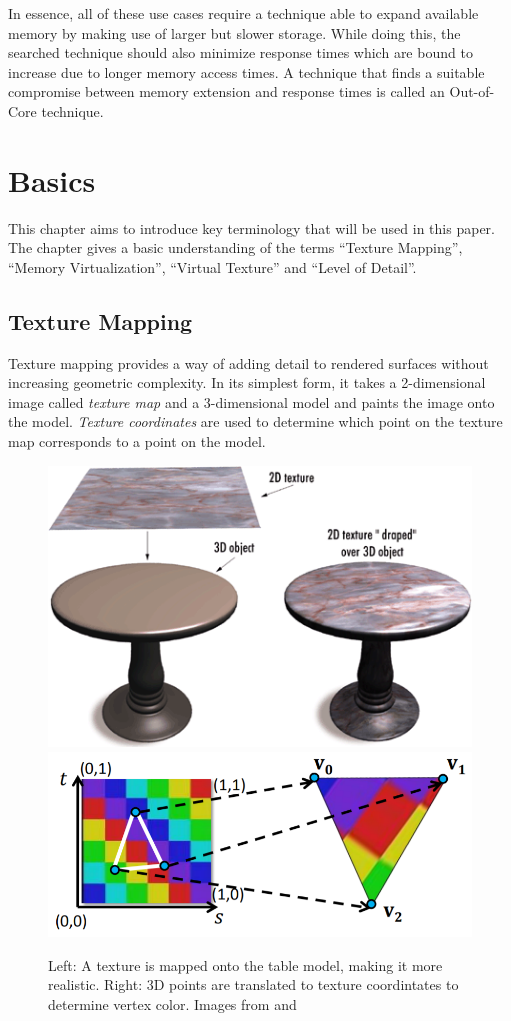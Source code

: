 In essence, all of these use cases require a technique able to expand available memory by making use of larger but slower storage. While doing this, the searched technique should also minimize response times which are bound to increase due to longer memory access times. A technique that finds a suitable compromise between memory extension and response times is called an Out-of-Core technique.

\chapter{Basics}
\label{ch:Basics}

This chapter aims to introduce key terminology that will be used in this paper. The chapter gives a basic understanding of the terms ``Texture Mapping'', ``Memory Virtualization'', ``Virtual Texture'' and ``Level of Detail''.

\section{Texture Mapping}

Texture mapping provides a way of adding detail to rendered surfaces without increasing geometric complexity. In its simplest form, it takes a 2-dimensional image called \textit{texture map} and a 3-dimensional model and paints the image onto the model. \textit{Texture coordinates} are used to determine which point on the texture map corresponds to a point on the model.

\begin{figure}[h]
  \begin{center}
    \includegraphics[width=.3\textwidth]{logos/texture_mapping_example.png}
    \hfill
    \includegraphics[width=.5\textwidth]{logos/texture_coordinates_example.png}
    \caption{Left: A texture is mapped onto the table model, making it more realistic. Right: 3D points are translated to texture coordintates to determine vertex color. Images from \cite{TextMapExample} and \cite{CompGraphics:2017:04:TexMap}}
  \end{center}
\end{figure}

